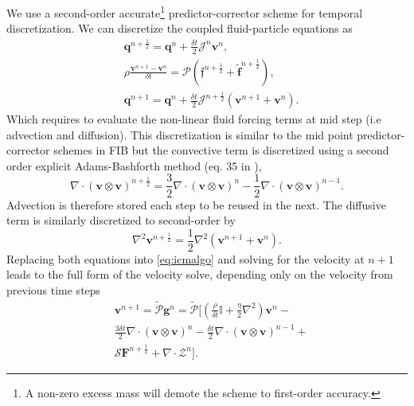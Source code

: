 \documentclass[ twoside,openright,titlepage,numbers=noenddot,%
headinclude,footinclude,cleardoublepage=empty,abstract=on,
BCOR=5mm,paper=a4,fontsize=11pt, dvipsnames
]{scrreprt}
\renewcommand{\vec}[1]{\bm{#1}}
\newcommand{\oper}[1]{\mathcal{#1}}
\newcommand{\dt}{\delta t}
\newcommand{\half}{\frac{1}{2}}
\newcommand{\ppos}{q}
\newcommand{\fvel}{v}
\begin{document}
We use a second-order accurate\footnote{A non-zero excess mass will demote the scheme to first-order accuracy.} predictor-corrector scheme for temporal discretization. We can discretize the coupled fluid-particle equations as
\begin{equation}
  \label{eq:icmalgo}
  \begin{aligned}
    &\vec{\ppos}^{n+\half} = \vec{\ppos}^n + \frac{\dt}{2}\oper{J}^n\vec{\fvel}^n,\\
    &\rho\frac{\vec{\fvel}^{n+1} - \vec{\fvel}^n}{\dt} = \oper{P}\left(\vec{\mathfrak{f}}^{n+\half} + \tilde{\vec{f}}^{n+\half} \right),\\
    &\vec{\ppos}^{n+1} = \vec{\ppos}^n + \frac{\dt}{2}\oper{J}^{n+\half}\left(\vec{\fvel}^{n+1} + \vec{\fvel}^{n}\right).
  \end{aligned}
\end{equation}
Which requires to evaluate the non-linear fluid forcing terms at mid step (i.e advection and diffusion).
This discretization is similar to the mid point predictor-corrector schemes in \gls{FIB} but the convective term is discretized using a second order explicit Adams-Bashforth method (eq. 35 in \cite{Balboa2014}),
\begin{equation}
  \nabla\cdot (\vec{\fvel}\otimes\vec{\fvel})^{n+\half} = \frac{3}{2} \nabla\cdot (\vec{\fvel}\otimes\vec{\fvel})^n - \half \nabla\cdot (\vec{\fvel}\otimes\vec{\fvel})^{n-1}.
\end{equation}
Advection is therefore stored each step to be reused in the next.
The diffusive term is similarly discretized to second-order by
\begin{equation}
  \nabla^2\vec{\fvel}^{n+\half} = \half\nabla^2\left(\vec{\fvel}^{n+1} + \vec{\fvel}^{n}\right).
\end{equation}
Replacing both equations into \eqref{eq:icmalgo} and solving for the velocity at $n+1$ leads to the full form of the velocity solve, depending only on the velocity from previous time steps
\begin{equation}
  \label{eq:icmfluidvel}
  \begin{aligned}
    &\vec{\fvel}^{n+1} = \tilde{\oper{P}}\vec{g}^n =\tilde{\oper{P}}\Big[    \left(\frac{\rho}{\dt}\mathbb{I} + \frac{\eta}{2}\nabla^2\right)\vec{\fvel}^n- \\
    & \frac{3\dt}{2} \nabla\cdot (\vec{\fvel}\otimes\vec{\fvel})^n - \frac{\dt}{2} \nabla\cdot (\vec{\fvel}\otimes\vec{\fvel})^{n-1}+\\
    &\oper{S}\vec{F}^{n+\half} + \nabla\cdot\mathcal{Z}^n \Big].
  \end{aligned}
\end{equation}
\end{document}
